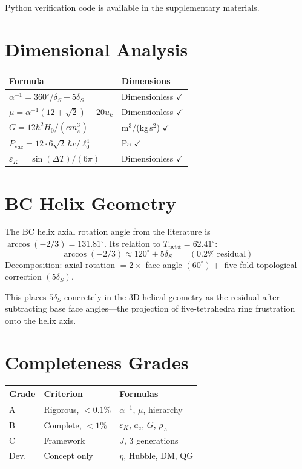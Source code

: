 \documentclass[12pt,a4paper,twocolumn]{article}
\newcommand{\dS}{\delta_{\!S}}
\newcommand{\Ttwist}{T_{\mathrm{twist}}}
\newcommand{\uk}{u_k}
\newcommand{\Pvac}{P_{\mathrm{vac}}}
\newcommand{\lzero}{\ell_0}
\begin{document}
Python verification code is available in the supplementary materials.

\section{Dimensional Analysis}
\label{app:dims}

\begin{center}
\small
\begin{tabular}{@{}ll@{}}
\toprule
Formula & Dimensions \\
\midrule
$\alpha^{-1} = 360^\circ/\dS - 5\dS$ & Dimensionless $\checkmark$ \\
$\mu = \alpha^{-1}(12\!+\!\sqrt{2}) - 20\uk$ & Dimensionless $\checkmark$ \\
$G = 12\hbar^2 H_0/(c m_\pi^3)$ & m$^3$/(kg\,s$^2$) $\checkmark$ \\
$\Pvac = 12\cdot6\sqrt{2}\,\hbar c/\lzero^4$ & Pa $\checkmark$ \\
$\varepsilon_K = \sin(\Delta T)/(6\pi)$ & Dimensionless $\checkmark$ \\
\bottomrule
\end{tabular}
\end{center}

\section{BC Helix Geometry}
\label{app:BC}

The BC helix axial rotation angle from the literature is $\arccos(-2/3) = 131.81^\circ$. Its relation to $\Ttwist = 62.41^\circ$:
\begin{equation}
\arccos(-2/3) \approx 120^\circ + 5\dS \qquad (0.2\%\;\text{residual})
\end{equation}
Decomposition: axial rotation $= 2\times$ face angle $(60^\circ) +$ five-fold topological correction $(5\dS)$.

This places $5\dS$ concretely in the 3D helical geometry as the residual after subtracting base face angles---the projection of five-tetrahedra ring frustration onto the helix axis.

\section{Completeness Grades}
\label{app:tiers}

\begin{center}
\small
\begin{tabular}{@{}lll@{}}
\toprule
Grade & Criterion & Formulas \\
\midrule
A & Rigorous, $<0.1\%$ & $\alpha^{-1}$, $\mu$, hierarchy \\
B & Complete, $<1\%$ & $\varepsilon_K$, $a_e$, $G$, $\rho_\Lambda$ \\
C & Framework & $J$, 3 generations \\
Dev.\ & Concept only & $\eta$, Hubble, DM, QG \\
\bottomrule
\end{tabular}
\end{center}
\end{document}
